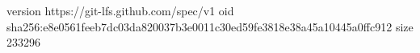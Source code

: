 version https://git-lfs.github.com/spec/v1
oid sha256:e8e0561feeb7dc03da820037b3e0011c30ed59fe3818e38a45a10445a0ffc912
size 233296

